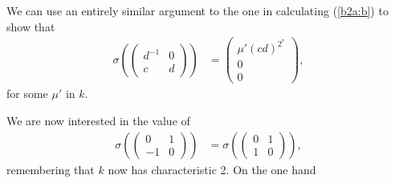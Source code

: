 	We can use an entirely similar argument to the one in calculating (\ref{b2a:b}) to show that
	\begin{align*}
	\sigma\left(
			\left(\begin{matrix} d^{-1} & 0 \\ c & d\end{matrix}\right)
			\right) &=
	\left(\begin{matrix} \mu'(cd)^{2^{r}} \\ 0 \\ 0 \end{matrix}\right),
	\end{align*}
	for some $\mu'$ in $k$. 

	We are now interested in the value of
	\begin{align*}
	\sigma\left(
			\left(\begin{matrix} 0 & 1 \\ -1 & 0 \end{matrix}\right)
			\right) &=
	\sigma\left(
			\left(\begin{matrix} 0 & 1 \\ 1 & 0 \end{matrix}\right)
			\right),
	\end{align*}
	remembering that $k$ now has characteristic 2. On the one hand
